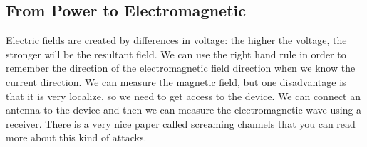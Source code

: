 \subsection { From Power to Electromagnetic }
Electric fields are created by differences in voltage: the higher the voltage, the stronger will be the resultant field. We can use the right hand rule in order to remember the direction of the electromagnetic field direction when we know the current direction. We can measure the magnetic field, but one disadvantage is that it is very localize, so we need to get access to the device. We can connect an antenna to the device and then we can measure the electromagnetic wave using a receiver. There is a very nice paper called screaming channels that you can read more about this kind of attacks.



